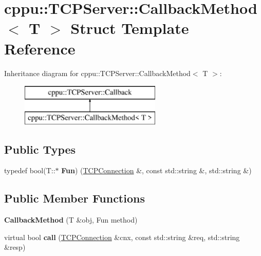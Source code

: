 \hypertarget{structcppu_1_1_t_c_p_server_1_1_callback_method}{}\section{cppu\+:\+:T\+C\+P\+Server\+:\+:Callback\+Method$<$ T $>$ Struct Template Reference}
\label{structcppu_1_1_t_c_p_server_1_1_callback_method}
Inheritance diagram for cppu\+:\+:T\+C\+P\+Server\+:\+:Callback\+Method$<$ T $>$\+:\begin{figure}[H]
\begin{center}
\leavevmode
\includegraphics[height=2.000000cm]{structcppu_1_1_t_c_p_server_1_1_callback_method}
\end{center}
\end{figure}
\subsection*{Public Types}
\begin{DoxyCompactItemize}
\item 
\mbox{\label{structcppu_1_1_t_c_p_server_1_1_callback_method_a6f71d878bd072aadf40d96d1db18eecd}} 
typedef bool(T\+::$\ast$ {\bfseries Fun}) (\mbox{\hyperlink{classcppu_1_1_t_c_p_connection}{T\+C\+P\+Connection}} \&, const std\+::string \&, std\+::string \&)
\end{DoxyCompactItemize}
\subsection*{Public Member Functions}
\begin{DoxyCompactItemize}
\item 
\mbox{\label{structcppu_1_1_t_c_p_server_1_1_callback_method_a0c6ceee6db8c67ef56fb26d1df52140f}} 
{\bfseries Callback\+Method} (T \&obj, Fun method)
\item 
\mbox{\label{structcppu_1_1_t_c_p_server_1_1_callback_method_a0c11039d0ed983c03a614d0764df3793}} 
virtual bool {\bfseries call} (\mbox{\hyperlink{classcppu_1_1_t_c_p_connection}{T\+C\+P\+Connection}} \&cnx, const std\+::string \&req, std\+::string \&resp)
\end{DoxyCompactItemize}
